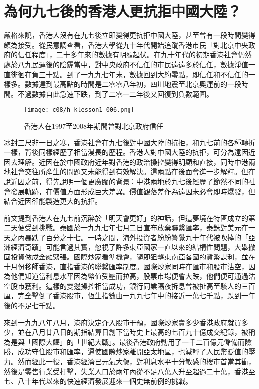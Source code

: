 \section{為何九七後的香港人更抗拒中國大陸？}

嚴格來說，香港人沒有在九七後立即變得更抗拒中國大陸，甚至曾有一段時間變得頗為接受。從民意調查看，香港大學從九十年代開始追蹤香港市民「對北京中央政府的信任程度」，二十多年來的數據有明顯起伏。在九十年代的初期香港社會仍然處於八九民運後的陰霾當中，對中央政府不信任的市民遠遠多於信任，數據淨值一直徘徊在負三十點。到了一九九七年末，數據回到大約零點，即信任和不信任的一樣多。數據達到最高點的時間是二零零八年初，四川地震至北京奧運前的一段時間。不過數據自此急速下跌，到了二零一二年後又回復到負數範圍。

\begin{figure}[htbp]
    \centering
    \texttt{[image: c08/h-klesson1-006.png]}
    \caption{香港人在1997至2008年期間曾對北京政府信任} 
\end{figure}

冰封三尺非一日之寒，香港社會在九七後對中國大陸的抗拒，和九七前的各種轉折一樣，背後同樣經歷了相當漫長的歷程。香港人對中國大陸的抗拒，可分為遠因近因去理解。近因在於中國政府近年對香港的政治操控變得明顯和直接，同時中港兩地社會交往所產生的問題又未能得到有效解決。這兩點在後面會進一步解釋。但在說近因之前，得先說明一個更廣闊的背景：中港兩地於九七後經歷了節然不同的社會發展軌跡，在價值方面形成巨大差異。價值觀落差作為遠因未必會即時爆發，但結合近因卻能製造更大的抗拒。

前文提到香港人在九七前沉醉於「明天會更好」的神話，但這夢境在特區成立的第二天便受到挑戰。泰國於一九九七年七月二日宣布放棄聯繫匯率，泰銖對美元在一天之內暴跌了百分之十七。一時之間，海外投資者紛紛警覺九十年代被吹捧的「亞洲經濟奇蹟」可能言過其實，忽視了許多東亞國家一直以來的結構性問題，大舉撤回投資做成金融緊張。國際炒家看準機會，隨即狙擊東南亞各國的貨幣謀利，並在十月份移師香港，直指香港的聯繫匯率制度。國際炒家同時在匯市和股市沽空，因為他們知道當利息水平因為幣值受壓而拉高，股票市場便會大跌，他們便可通過沽空股市獲利。這樣的雙邊操控相當成功，銀行同業隔夜拆息曾被扯高至駭人的三百厘，完全擊倒了香港股市，恆生指數由一九九七年中的接近一萬七千點，跌到一年後的不足七千點。

來到一九九八年八月，港府決定介入股市干預，國際炒家賣多少香港政府就買多少，並在八月廿八日的期指結算日創下當時史上最高的七百九十億成交紀錄，被稱為是與「國際大鱷」的「世紀大戰」。最後香港政府動用了一千二百億元儲備而險勝，成功守住股市和匯率，逼使國際炒家離開亞太地區，也減輕了人民幣貶值的壓力。然而經此一役，香港經濟已元氣大傷，對利息水平十分敏感的樓市首當其衝，然後是零售行業受打擊，失業人口於兩年內從不足八萬人升至超過二十萬，香港至七、八十年代以來的快速經濟發展迎來一個史無前例的挑戰。

